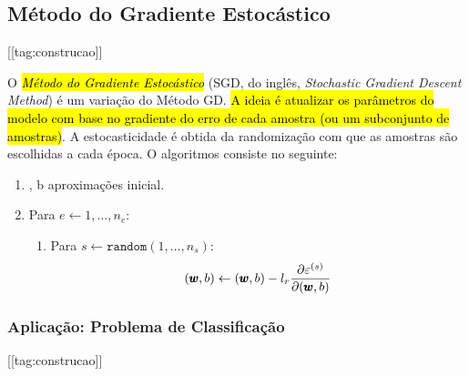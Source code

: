\subsection{Método do Gradiente Estocástico}
[[tag:construcao]]

O \hl{\emph{Método do Gradiente Estocástico}} (SGD, do inglês, \textit{Stochastic Gradient Descent Method}) é um variação do Método GD. \hl{A ideia é atualizar os parâmetros do modelo com base no gradiente do erro de cada amostra (ou um subconjunto de amostras)}. A estocasticidade é obtida da randomização com que as amostras são escolhidas a cada época. O algoritmos consiste no seguinte:
\begin{enumerate}[1.]
\item {}, b aproximações inicial.
\item Para $e\leftarrow 1,\dotsc, n_e$:
  \begin{enumerate}[1.1.]
  \item Para $s\leftarrow \texttt{random}(1,\dotsc, n_s)$:
    \begin{equation}
      (\pmb{w}, b) \leftarrow (\pmb{w}, b) - l_r\frac{\partial\varepsilon^{(s)}}{\partial(\pmb{w}, b)}
    \end{equation}
  \end{enumerate}
\end{enumerate}

\subsubsection{Aplicação: Problema de Classificação}
[[tag:construcao]]

